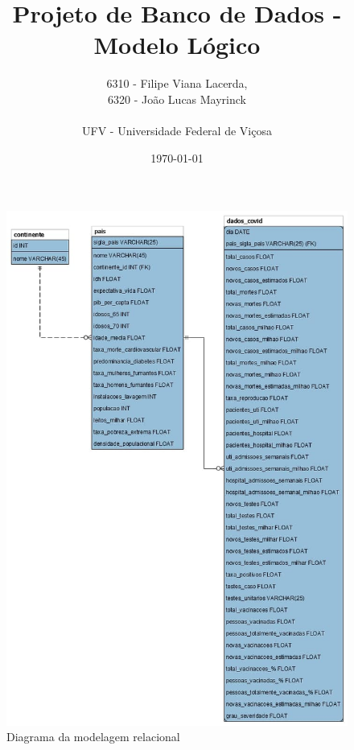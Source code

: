 \documentclass{article}
\title{Projeto de Banco de Dados - Modelo Lógico}
\author{6310 - Filipe Viana Lacerda,\\6320 - João Lucas Mayrinck\\\\ \small{UFV - Universidade Federal de Viçosa}}
\date{\today}
\begin{document}
    \maketitle

    \begin{figure}
        
        \centering
        \includegraphics[scale=0.64]{MLR.png}
        \caption{Diagrama da modelagem relacional}

    \end{figure}
    
\end{document}
